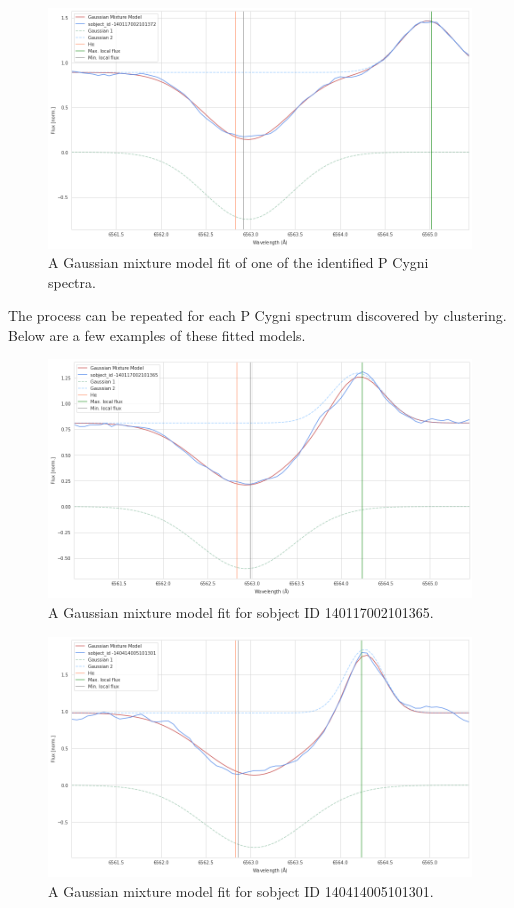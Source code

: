 \begin{figure}[!htb]
\centering
\includegraphics[scale=0.45]{figures/p cugni fitted.png}
\caption{A Gaussian mixture model fit of one of the identified P Cygni spectra.}
\end{figure}

The process can be repeated for each P Cygni spectrum discovered by clustering. Below are a few examples of these fitted models. 

\begin{figure}[!htb]
\centering
\includegraphics[scale=0.45]{figures/p cygni fitted 2.png}
\caption{A Gaussian mixture model fit for sobject ID 140117002101365. }
\end{figure}

\begin{figure}[!htb]
\centering
\includegraphics[scale=0.45]{figures/p cygni fitted 3.png}
\caption{A Gaussian mixture model fit for sobject ID 140414005101301. }
\end{figure}

